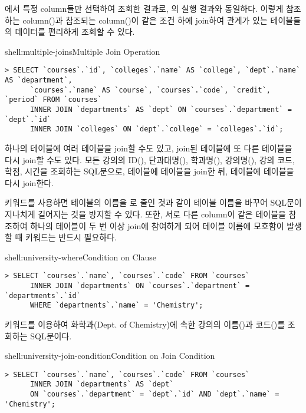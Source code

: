 \는 에서 특정 column들만 선택하여 조회한 결과로, 의 실행 결과와 동일하다. 이렇게 참조하는 column()과 참조되는 column()이 같은 조건 하에 join하여 관계가 있는 테이블들의 데이터를 편리하게 조회할 수 있다.
\clearpage

\begin{shellenv}{shell:multiple-joins}{Multiple Join Operation}
\begin{verbatim}
> SELECT `courses`.`id`, `colleges`.`name` AS `college`, `dept`.`name` AS `department`,
      `courses`.`name` AS `course`, `courses`.`code`, `credit`, `period` FROM `courses`
      INNER JOIN `departments` AS `dept` ON `courses`.`department` = `dept`.`id`
      INNER JOIN `colleges` ON `dept`.`college` = `colleges`.`id`;
\end{verbatim}
\end{shellenv}

하나의 테이블에 여러 테이블을 join할 수도 있고, join된 테이블에 또 다른 테이블을 다시 join할 수도 있다. \는 모든 강의의 ID(), 단과대명(), 학과명(), 강의명(), 강의 코드, 학점, 시간을 조회하는 SQL문으로,  테이블에  테이블을 join한 뒤,  테이블에  테이블을 다시 join한다.

 키워드를 사용하면  테이블의 이름을 로 줄인 것과 같이 테이블 이름을 바꾸어 SQL문이 지나치게 길어지는 것을 방지할 수 있다. 또한, 서로 다른 column이 같은 테이블을 참조하여 하나의 테이블이 두 번 이상 join에 참여하게 되어 테이블 이름에 모호함이 발생할 때  키워드는 반드시 필요하다.

\begin{shellenv}{shell:university-where}{Condition on  Clause}\begin{verbatim}
> SELECT `courses`.`name`, `courses`.`code` FROM `courses`
      INNER JOIN `departments` ON `courses`.`department` = `departments`.`id`
      WHERE `departments`.`name` = 'Chemistry';
\end{verbatim}
\end{shellenv}

\는  키워드를 이용하여 화학과(Dept. of Chemistry)에 속한 강의의 이름()과 코드()를 조회하는 SQL문이다.

\begin{shellenv}{shell:university-join-condition}{Condition on Join Condition}\begin{verbatim}
> SELECT `courses`.`name`, `courses`.`code` FROM `courses`
      INNER JOIN `departments` AS `dept`
      ON `courses`.`department` = `dept`.`id` AND `dept`.`name` = 'Chemistry';
\end{verbatim}
\end{shellenv}

